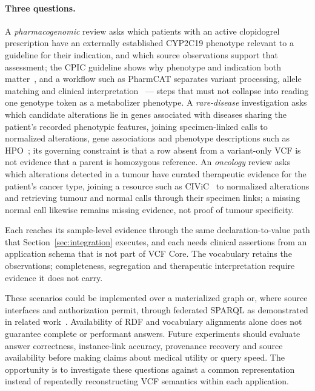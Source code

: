 \documentclass{ceurart}
\begin{document}
\paragraph{Three questions.}
A \emph{pharmacogenomic} review asks which patients with an active clopidogrel prescription have an externally established CYP2C19 phenotype relevant to a guideline for their indication, and which source observations support that assessment; the CPIC guideline shows why phenotype and indication both matter~\cite{lee2022cpic}, and a workflow such as PharmCAT separates variant processing, allele matching and clinical interpretation~\cite{pharmcatmethods} --- steps that must not collapse into reading one genotype token as a metabolizer phenotype. 
A \emph{rare-disease} investigation asks which candidate alterations lie in genes associated with diseases sharing the patient's recorded phenotypic features, joining specimen-linked calls to normalized alterations, gene associations and phenotype descriptions such as HPO~\cite{hpo}; its governing constraint is that a row absent from a variant-only VCF is not evidence that a parent is homozygous reference. 
An \emph{oncology} review asks which alterations detected in a tumour have curated therapeutic evidence for the patient's cancer type, joining a resource such as CIViC~\cite{griffith2017civic} to normalized alterations and retrieving tumour and normal calls through their specimen links; a missing normal call likewise remains missing evidence, not proof of tumour specificity.

Each reaches its sample-level evidence through the same declaration-to-value path that Section~\ref{sec:integration} executes, and each needs clinical assertions from an application schema that is not part of VCF Core. 
The vocabulary retains the observations; completeness, segregation and therapeutic interpretation require evidence it does not carry.

These scenarios could be implemented over a materialized graph or, where source interfaces and authorization permit, through federated SPARQL as demonstrated in related work~\cite{bodrug2025semantic}. Availability of RDF and vocabulary alignments alone does not guarantee complete or performant answers. Future experiments should evaluate answer correctness, instance-link accuracy, provenance recovery and source availability before making claims about medical utility or query speed. The opportunity is to investigate these questions against a common representation instead of repeatedly reconstructing VCF semantics within each application.
\end{document}
